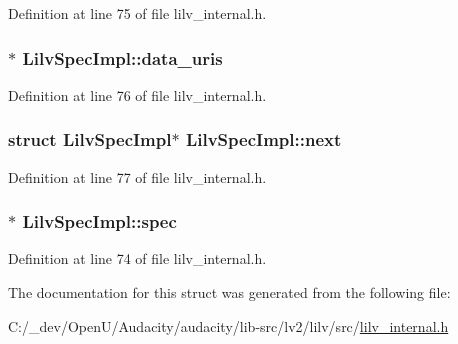 Definition at line 75 of file lilv\+\_\+internal.\+h.

\subsubsection[{\texorpdfstring{data\+\_\+uris}{data_uris}}]{$\ast$ Lilv\+Spec\+Impl\+::data\+\_\+uris}\hypertarget{struct_lilv_spec_impl_a77496c19f1149e32134bf4d0b52cee04}{}\label{struct_lilv_spec_impl_a77496c19f1149e32134bf4d0b52cee04}


Definition at line 76 of file lilv\+\_\+internal.\+h.

\subsubsection[{\texorpdfstring{next}{next}}]{\setlength{\rightskip}{0pt plus 5cm}struct {\bf Lilv\+Spec\+Impl}$\ast$ Lilv\+Spec\+Impl\+::next}\hypertarget{struct_lilv_spec_impl_a55bd8eb6d22428cd766b40ca088b505d}{}\label{struct_lilv_spec_impl_a55bd8eb6d22428cd766b40ca088b505d}


Definition at line 77 of file lilv\+\_\+internal.\+h.

\subsubsection[{\texorpdfstring{spec}{spec}}]{$\ast$ Lilv\+Spec\+Impl\+::spec}\hypertarget{struct_lilv_spec_impl_a659bf23b85a605a3db91623634fe24ae}{}\label{struct_lilv_spec_impl_a659bf23b85a605a3db91623634fe24ae}


Definition at line 74 of file lilv\+\_\+internal.\+h.



The documentation for this struct was generated from the following file\+:\begin{DoxyCompactItemize}
\item 
C\+:/\+\_\+dev/\+Open\+U/\+Audacity/audacity/lib-\/src/lv2/lilv/src/\hyperlink{lilv__internal_8h}{lilv\+\_\+internal.\+h}\end{DoxyCompactItemize}
